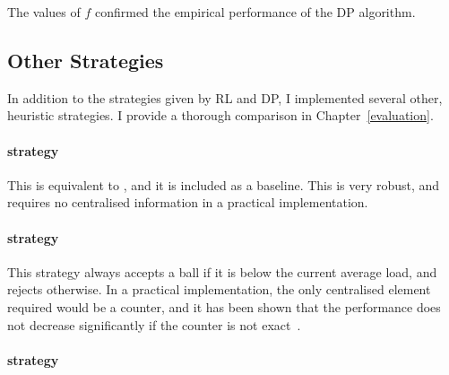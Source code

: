The values of $f$ confirmed the empirical performance of the DP algorithm.

\subsection{Other Strategies}

In addition to the strategies given by RL and DP, I implemented several other, heuristic strategies. I provide a thorough comparison in Chapter~\ref{evaluation}.


\paragraph{\AlwaysAccept strategy}
This is equivalent to \OneChoice, and it is included as a baseline. This is very robust, and requires no centralised information in a practical implementation.


\paragraph{\MeanThinning strategy}
This strategy always accepts a ball if it is below the current average load, and rejects otherwise. In a practical implementation, the only centralised element required would be a counter, and it has been shown that the performance does not decrease significantly if the counter is not exact~\cite{los2022cachingpackingthinningtwinning}. 


\paragraph{\LocalRewardOptimiser strategy}


